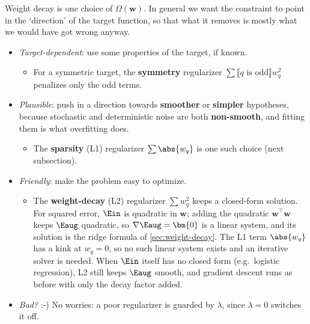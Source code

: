 Weight decay is one choice of \(\Omega(\bm{w})\). In general we want the
constraint to point in the `direction' of the target function, so that what
it removes is mostly what we would have got wrong anyway.
\begin{itemize}
    \item \emph{Target-dependent}: use some properties of the target, if known.
        \begin{itemize}
            \item For a symmetric target, the \textbf{symmetry} regularizer
                \(\sum \llbracket q \text{ is odd} \rrbracket w_q^2\) penalizes
                only the odd terms.
        \end{itemize}
    \item \emph{Plausible}: push in a direction towards \textbf{smoother} or
        \textbf{simpler} hypotheses, because stochastic and deterministic
        noise are both \textbf{non-smooth}, and fitting them is what
        overfitting does.
        \begin{itemize}
            \item The \textbf{sparsity} (L1) regularizer \(\sum \abs{w_q}\)
                is one such choice (next subsection).
        \end{itemize}
    \item \emph{Friendly}: make the problem easy to optimize.
        \begin{itemize}
            \item The \textbf{weight-decay} (L2) regularizer \(\sum w_q^2\)
                keeps a closed-form solution. For squared error, \(\Ein\) is
                quadratic in \(\bm{w}\); adding the quadratic \(\bm{w}^\top
                \bm{w}\) keeps \(\Eaug\) quadratic, so \(\nabla \Eaug =
                \bm{0}\) is a linear system, and its solution is the ridge formula of
                \autoref{sec:weight-decay}. The L1 term \(\abs{w_q}\) has a
                kink at \(w_q = 0\), so no such linear system exists and an
                iterative solver is needed. When \(\Ein\) itself has no closed
                form (e.g.\ logistic regression), L2 still keeps \(\Eaug\)
                smooth, and gradient descent runs as before with only the
                decay factor added.
        \end{itemize}
    \item \emph{Bad?} :-) No worries: a poor regularizer is guarded by
        \(\lambda\), since \(\lambda = 0\) switches it off.
\end{itemize}

